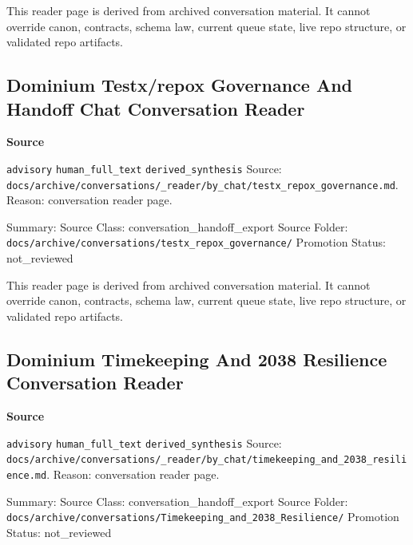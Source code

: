 \documentclass[9pt,a4paper,openany]{book}
\newcommand{\vonecallout}[3]{\par\medskip\noindent\begingroup\setlength{\fboxsep}{7pt}\colorbox{DomCalloutBg}{\parbox{0.94\linewidth}{\textbf{\textcolor{#1}{#2}}\par #3}}\endgroup\par\medskip}
\begin{document}
This reader page is derived from archived conversation material.\allowbreak{} It cannot override canon, contracts, schema law, current queue state, live repo structure, or validated repo artifacts.\allowbreak{}



\subsection{Dominium Testx/repox Governance And Handoff Chat Conversation Reader}

\vonecallout{DomSlate}{Source}{\texttt{advisory} \texttt{human\_\allowbreak{}full\_\allowbreak{}text} \texttt{derived\_\allowbreak{}synthesis} Source: \texttt{docs/\allowbreak{}archive/\allowbreak{}conversations/\allowbreak{}\_\allowbreak{}reader/\allowbreak{}by\_\allowbreak{}chat/\allowbreak{}testx\_\allowbreak{}repox\_\allowbreak{}governance.\allowbreak{}md}.\allowbreak{} Reason: conversation reader page.\allowbreak{}}

Summary: Source Class: conversation\_\allowbreak{}handoff\_\allowbreak{}export Source Folder: \texttt{docs/\allowbreak{}archive/\allowbreak{}conversations/\allowbreak{}testx\_\allowbreak{}repox\_\allowbreak{}governance/\allowbreak{}} Promotion Status: not\_\allowbreak{}reviewed


This reader page is derived from archived conversation material.\allowbreak{} It cannot override canon, contracts, schema law, current queue state, live repo structure, or validated repo artifacts.\allowbreak{}



\subsection{Dominium Timekeeping And 2038 Resilience Conversation Reader}

\vonecallout{DomSlate}{Source}{\texttt{advisory} \texttt{human\_\allowbreak{}full\_\allowbreak{}text} \texttt{derived\_\allowbreak{}synthesis} Source: \texttt{docs/\allowbreak{}archive/\allowbreak{}conversations/\allowbreak{}\_\allowbreak{}reader/\allowbreak{}by\_\allowbreak{}chat/\allowbreak{}timekeeping\_\allowbreak{}and\_\allowbreak{}2038\_\allowbreak{}resilience.\allowbreak{}md}.\allowbreak{} Reason: conversation reader page.\allowbreak{}}

Summary: Source Class: conversation\_\allowbreak{}handoff\_\allowbreak{}export Source Folder: \texttt{docs/\allowbreak{}archive/\allowbreak{}conversations/\allowbreak{}Timekeeping\_\allowbreak{}and\_\allowbreak{}2038\_\allowbreak{}Resilience/\allowbreak{}} Promotion Status: not\_\allowbreak{}reviewed
\end{document}
